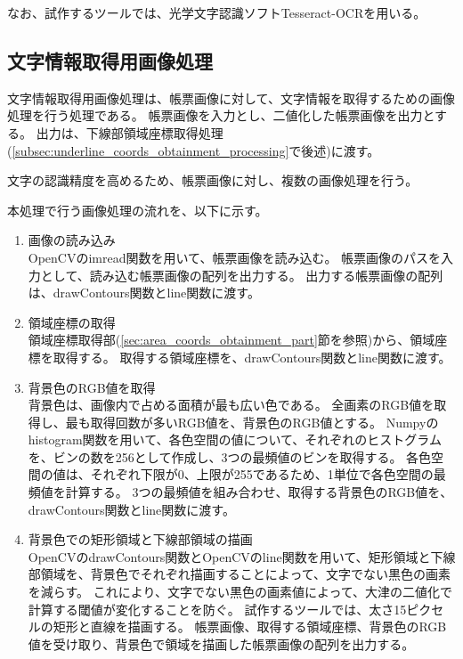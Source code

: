 なお、試作するツールでは、光学文字認識ソフトTesseract-OCR\cite{Tesseract-OCR}を用いる。

\subsection{文字情報取得用画像処理}\label{subsec:image_processing_for_char_recognition}
文字情報取得用画像処理は、帳票画像に対して、文字情報を取得するための画像処理を行う処理である。
帳票画像を入力とし、二値化した帳票画像を出力とする。
出力は、下線部領域座標取得処理(\ref{subsec:underline_coords_obtainment_processing}で後述)に渡す。

文字の認識精度を高めるため、帳票画像に対し、複数の画像処理を行う。

本処理で行う画像処理の流れを、以下に示す。

\begin{enumerate}
    \item 画像の読み込み\\
        OpenCVのimread関数を用いて、帳票画像を読み込む。
        帳票画像のパスを入力として、読み込む帳票画像の配列を出力する。
        出力する帳票画像の配列は、drawContours関数とline関数に渡す。
    \item 領域座標の取得\\
        領域座標取得部(\ref{sec:area_coords_obtainment_part}節を参照)から、領域座標を取得する。
        取得する領域座標を、drawContours関数とline関数に渡す。
    \item 背景色のRGB値を取得\\
        背景色は、画像内で占める面積が最も広い色である。
        全画素のRGB値を取得し、最も取得回数が多いRGB値を、背景色のRGB値とする。
        Numpyのhistogram関数を用いて、各色空間の値について、それぞれのヒストグラムを、ビンの数を256として作成し、3つの最頻値のビンを取得する。
        各色空間の値は、それぞれ下限が0、上限が255であるため、1単位で各色空間の最頻値を計算する。
        3つの最頻値を組み合わせ、取得する背景色のRGB値を、drawContours関数とline関数に渡す。
    \item 背景色での矩形領域と下線部領域の描画\\
        OpenCVのdrawContours関数とOpenCVのline関数を用いて、矩形領域と下線部領域を、背景色でそれぞれ描画することによって、文字でない黒色の画素を減らす。
        これにより、文字でない黒色の画素値によって、大津の二値化で計算する閾値が変化することを防ぐ。
        試作するツールでは、太さ15ピクセルの矩形と直線を描画する。
        帳票画像、取得する領域座標、背景色のRGB値を受け取り、背景色で領域を描画した帳票画像の配列を出力する。

\end{enumerate}

